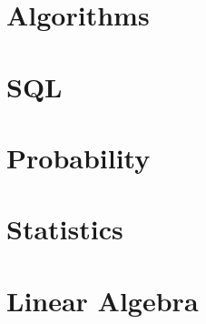 \documentclass[11pt,letterpaper,oneside]{memoir}
\theoremstyle{definition}
\begin{document}
\chapter{Algorithms}
\chapter{SQL}
\chapter{Probability}
\chapter{Statistics}
\chapter{Linear Algebra}
\printnoidxglossaries


\end{document}

